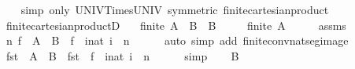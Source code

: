 \begin{isabellebody}
%
\isadelimproof
\ \ %
\endisadelimproof
%
\isatagproof
{}\isamarkupfalse%
\ {\isacharparenleft}{\kern0pt}simp\ only{\isacharcolon}{\kern0pt}\ UNIV{\isacharunderscore}{\kern0pt}Times{\isacharunderscore}{\kern0pt}UNIV\ {\isacharbrackleft}{\kern0pt}symmetric{\isacharbrackright}{\kern0pt}\ finite{\isacharunderscore}{\kern0pt}cartesian{\isacharunderscore}{\kern0pt}product{\isacharparenright}{\kern0pt}%
\endisatagproof
{\isafoldproof}%
%
\isadelimproof
\isanewline
%
\endisadelimproof
\isanewline
{}\isamarkupfalse%
\ finite{\isacharunderscore}{\kern0pt}cartesian{\isacharunderscore}{\kern0pt}productD{}{\isacharcolon}{\kern0pt}\isanewline
\ \ \ {\isachardoublequoteopen}finite\ {\isacharparenleft}{\kern0pt}A\ {\isasymtimes}\ B{\isacharparenright}{\kern0pt}{\isachardoublequoteclose}\ \ {\isachardoublequoteopen}B\ {\isasymnoteq}\ {\isacharbraceleft}{\kern0pt}{\isacharbraceright}{\kern0pt}{\isachardoublequoteclose}\isanewline
\ \ \ {\isachardoublequoteopen}finite\ A{\isachardoublequoteclose}\isanewline
%
\isadelimproof
%
\endisadelimproof
%
\isatagproof
{}\isamarkupfalse%
\ {\isacharminus}{\kern0pt}\isanewline
\ \ \isamarkupfalse%
\ assms\ \isamarkupfalse%
\ n\ f\ \ {\isachardoublequoteopen}A\ {\isasymtimes}\ B\ {\isacharequal}{\kern0pt}\ f\ {\isacharbackquote}{\kern0pt}\ {\isacharbraceleft}{\kern0pt}i{\isacharcolon}{\kern0pt}{\isacharcolon}{\kern0pt}nat{\isachardot}{\kern0pt}\ i\ {\isacharless}{\kern0pt}\ n{\isacharbraceright}{\kern0pt}{\isachardoublequoteclose}\isanewline
\ \ \ \ \isamarkupfalse%
\ {\isacharparenleft}{\kern0pt}auto\ simp\ add{\isacharcolon}{\kern0pt}\ finite{\isacharunderscore}{\kern0pt}conv{\isacharunderscore}{\kern0pt}nat{\isacharunderscore}{\kern0pt}seg{\isacharunderscore}{\kern0pt}image{\isacharparenright}{\kern0pt}\isanewline
\ \ \isamarkupfalse%
\ \isamarkupfalse%
\ {\isachardoublequoteopen}fst\ {\isacharbackquote}{\kern0pt}\ {\isacharparenleft}{\kern0pt}A\ {\isasymtimes}\ B{\isacharparenright}{\kern0pt}\ {\isacharequal}{\kern0pt}\ fst\ {\isacharbackquote}{\kern0pt}\ f\ {\isacharbackquote}{\kern0pt}\ {\isacharbraceleft}{\kern0pt}i{\isacharcolon}{\kern0pt}{\isacharcolon}{\kern0pt}nat{\isachardot}{\kern0pt}\ i\ {\isacharless}{\kern0pt}\ n{\isacharbraceright}{\kern0pt}{\isachardoublequoteclose}\isanewline
\ \ \ \ \isamarkupfalse%
\ simp\isanewline
\ \ \isamarkupfalse%
\ {\isacartoucheopen}B\ {\isasymnoteq}\ {\isacharbraceleft}{\kern0pt}{\isacharbraceright}{\kern0pt}{\isacartoucheclose}\ \isamarkupfalse%

\end{isabellebody}
